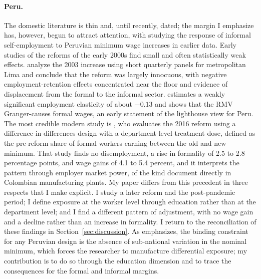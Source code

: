 \paragraph{Peru.} The domestic literature is thin and, until recently, dated; the margin I emphasize has, however, begun to attract attention, with \citet{corcuera_2024} studying the response of informal self-employment to Peruvian minimum wage increases in earlier data. Early studies of the reforms of the early 2000s find small and often statistically weak effects. \citet{jaramillo_lopez_2006} analyze the 2003 increase using short quarterly panels for metropolitan Lima and conclude that the reform was largely innocuous, with negative employment-retention effects concentrated near the floor and evidence of displacement from the formal to the informal sector. \citet{cespedes_2005} estimates a weakly significant employment elasticity of about $-0.13$ and shows that the RMV Granger-causes formal wages, an early statement of the lighthouse view for Peru. The most credible modern study is \citet{jimenez_2023}, who evaluates the 2016 reform using a difference-in-differences design with a department-level treatment dose, defined as the pre-reform share of formal workers earning between the old and new minimum. That study finds no disemployment, a rise in formality of 2.5 to 2.8 percentage points, and wage gains of 4.1 to 5.4 percent, and it interprets the pattern through employer market power, of the kind \citet{amodio_deroux_2021} document directly in Colombian manufacturing plants. My paper differs from this precedent in three respects that I make explicit. I study a later reform and the post-pandemic period; I define exposure at the worker level through education rather than at the department level; and I find a different pattern of adjustment, with no wage gain and a decline rather than an increase in formality. I return to the reconciliation of these findings in Section~\ref{sec:discussion}. As \citet{jimenez_2023} emphasizes, the binding constraint for any Peruvian design is the absence of sub-national variation in the nominal minimum, which forces the researcher to manufacture differential exposure; my contribution is to do so through the education dimension and to trace the consequences for the formal and informal margins.

